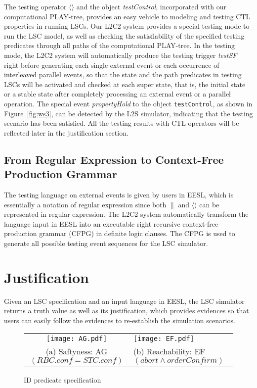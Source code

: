 \documentclass[]{llncs}
\begin{document}
The testing operator $\langle\rangle$ and the object {\em testControl},
incorporated with our computational PLAY-tree, provides
an easy vehicle to modeling and testing CTL properties in running LSCs.
Our L2C2 system provides a special testing mode to run the LSC model,
as well as checking the satisfiability of the specified testing
predicates through all paths of the computational PLAY-tree.
In the testing mode, the L2C2 system will automatically
produce the testing trigger {\em testSF} right before generating
each single external event or each occurrence of interleaved parallel events,
so that the state and the path predicates in testing LSCs will be activated
and checked at each super state, that is, the initial state or
a stable state after completely processing an external event or a parallel operation.
The special event {\em propertyHold} to the object {\tt testControl},
as shown in Figure~\ref{fig:ws3}, can be detected by the L2S simulator, indicating
that the testing scenario has been satisfied. All the testing results
with CTL operators will be reflected later in the justification section.

\subsection{From Regular Expression to Context-Free Production Grammar}

The testing language on external events is
given by users in EESL, which is essentially a notation of
regular expression since both $\|$ and $\langle\rangle$
can be represented in regular expression.
The L2C2 system automatically transform the language input in EESL
into an executable right recursive context-free production grammar (CFPG)
in definite logic clauses.
The CFPG is used to generate all possible testing event sequences for
the LSC simulator.

\section{Justification}
\label{sec:justification}

Given an LSC specification and an input language in EESL,
the LSC simulator returns a truth value as well as its justification, which provides evidences
so that users can easily follow the
evidences to re-establish the simulation scenarios.

\begin{figure*}[!ht]
	\centering
	\begin{tabular}{cl}
		\texttt{[image: AG.pdf]}
		&
		\texttt{[image: EF.pdf]} \\
	  (a) Saftyness: AG$(RBC.conf=STC.conf)$
	  &
	  (b) Reachability: EF$(abort\wedge orderConfirm)$
	\end{tabular}
\caption{ID predicate specification}
\label{fig:ws4}
\end{figure*}
\end{document}
